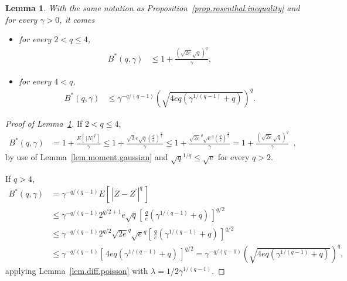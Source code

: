 \documentclass[twoside,11pt]{article}
\numberwithin{equation}{section}
\newtheorem{lem}{Lemma}[section]
\newcommand{\1}{\mathds{1}}%
\newcommand{\paren}[1]{\left( #1 \right)}
\newcommand{\croch}[1]{\left[\, #1 \,\right]}
\newcommand{\abs}[1]{\left\lvert #1 \right\rvert} %
\numberwithin{equation}{section}
\theoremstyle{plain}
\begin{document}
\begin{lem}\label{lem.rosenthal.ineq.optimal.constant.upper.bound}
%
With the same notation as Proposition~\ref{prop.rosenthal.inequality} and for every $\gamma>0$, it comes
\begin{itemize}
  \item for every $2<q\leq 4$,
\begin{align*}
  B^*(q,\gamma) & \leq 1+ \frac{  \paren{ \sqrt{2e} \sqrt{q} }^{q} }{\gamma} ,
\end{align*}



  \item for every $4<q$,
\begin{align*}
  B^*(q,\gamma) & \leq  \gamma^{-q/(q-1)}  \paren{ \sqrt{ 4e q \paren{ \gamma^{1/(q-1)} + q} } }^q .
\end{align*}

\end{itemize}

\end{lem}





\begin{proof}[Proof of Lemma~\ref{lem.rosenthal.ineq.optimal.constant.upper.bound}]

If $2<q\leq 4$,
\begin{align*}
  B^*(q,\gamma)  & =  1+ \frac{E\croch{\abs{ N}^q} }{\gamma} \leq 1+ \frac{ \sqrt{2} e \sqrt{q} \paren{ \frac{q}{e} }^{\frac{q}{2}} }{\gamma} \leq 1+ \frac{ \sqrt{2e}^q \sqrt{e}^q \paren{ \frac{q}{e} }^{\frac{q}{2}} }{\gamma}  = 1+ \frac{  \paren{ \sqrt{2e} \sqrt{q} }^{q} }{\gamma} \enspace ,
\end{align*}
by use of Lemma~\ref{lem.moment.gaussian} and $\sqrt{q}^{1/q} \leq \sqrt{e}$ for every $q>2$.

If $q>4$,
\begin{align*}
  B^*(q,\gamma)  & = \gamma^{-q/(q-1)} E\croch{ \abs{ Z - Z^\prime }^q } \\
%
& \leq \gamma^{-q/(q-1)} 2^{q/2+1} e \sqrt{q} \croch{\frac{q}{e} \paren{ \gamma^{1/(q-1)} + q} }^{q/2} \\
%
& \leq \gamma^{-q/(q-1)} 2^{q/2} \sqrt{2e}^q \sqrt{e}^q \croch{\frac{q}{e} \paren{ \gamma^{1/(q-1)} + q} }^{q/2} \\
%
& \leq \gamma^{-q/(q-1)}  \croch{ 4e q \paren{ \gamma^{1/(q-1)} + q} }^{q/2} =  \gamma^{-q/(q-1)}  \paren{ \sqrt{ 4e q \paren{ \gamma^{1/(q-1)} + q} } }^q ,
\end{align*}
applying Lemma~\ref{lem.diff.poisson} with $\lambda = 1/2 \gamma^{1/(q-1)}$.


\end{proof}
\end{document}
